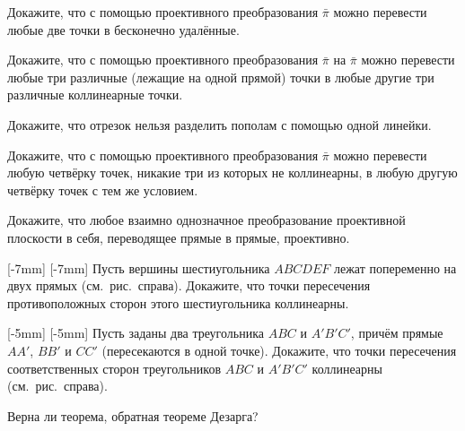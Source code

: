\documentclass[a4paper,12pt]{article}
\newcommand{\rightpicture}[4]%
{\ifthenelse{\lengthtest{10mm>#3mm}}%
{\marginnote{\hbox to #1 {\hss\texttt{[image: \#4]}}}[-#2]}%
{\marginnote{\hbox to #1 {\hss\texttt{[image: \#4]}}}[-#2]}}
\begin{document}
 Докажите, что с помощью проективного преобразования
$\bar\pi$ можно перевести любые две точки в  бесконечно
удалённые. 

 Докажите, что с помощью проективного преобразования
$\bar\pi$ на $\bar\pi$ можно перевести любые три различные
 (лежащие на одной прямой) точки в любые другие
три различные коллинеарные точки. 

 Докажите, что отрезок нельзя разделить пополам с помощью
одной линейки. 

 Докажите, что с помощью проективного преобразования
$\bar\pi$ можно перевести любую четвёрку точек, никакие три из
которых не коллинеарны, в любую другую четвёрку точек с тем же
условием. 

 Докажите, что любое взаимно однозначное преобразование
проективной плоскости в себя, переводящее прямые в прямые,
проективно. 

\rightpicture{-3mm}{7mm}{63mm}{proj_geom-3}
 Пусть вершины
шестиугольника $ABCDEF$ лежат попеременно на двух прямых
(см.~рис.~справа). Докажите, что точки пересечения противоположных
сторон этого шестиугольника коллинеарны. 

\rightpicture{-3mm}{5mm}{68mm}{proj_geom-4}
 Пусть заданы
два треугольника $ABC$ и $A'B'C'$, причём прямые $AA'$, $BB'$ и
$CC'$  (пересекаются в одной точке). Докажите, что
точки пересечения соответственных сторон треугольников $ABC$ и
$A'B'C'$ коллинеарны (см.~рис.~справа). 

 Верна ли теорема, обратная теореме Дезарга? 



\end{document}
